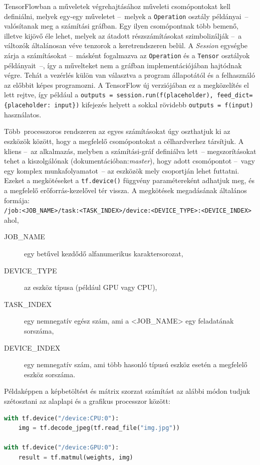 TensorFlowban a műveletek végrehajtásához műveleti csomópontokat kell definiálni, melyek egy-egy műveletet --~melyek a \verb|Operation| osztály példányai~-- valósítanak meg a számítási gráfban. Egy ilyen csomópontnak több bemenő, illetve kijövő éle lehet, melyek az átadott részszámításokat szimbolizálják --~a változók általánosan véve tenzorok a keretrendszeren belül. A \emph{Session} egységbe zárja a számításokat --~másként fogalmazva az \verb|Operation| és a \verb|Tensor| osztályok példányait~--, így a művelteket nem a gráfban implementációjában hajtódnak végre. Tehát a vezérlés külön van választva a program állapotától és a felhasználó az előbbit képes programozni. A TensorFlow új verziójában ez a megközelítés el lett rejtve, így például a \verb|outputs = session.run(f(placeholder), feed_dict={placeholder: input})| kifejezés helyett a sokkal rövidebb \verb|outputs = f(input)| használatos.

Több~processzoros rendszeren az egyes számításokat úgy oszthatjuk ki az eszközök között, hogy a megfelelő csomópontokat a célhardverhez társítjuk.
A kliens --~az alkalmazás, melyben a számítási-gráf definiálva lett~-- megszorításokat tehet a kiszolgálónak (dokumentációban:\emph{master}), hogy adott csomópontot --~vagy egy komplex munkafolyamatot~-- az eszközök mely csoportján lehet futtatni. Ezeket a megkötéseket a \verb|tf.device()| függvény paramétereként adhatjuk meg, és a megfelelő erőforrás-kezelővel tér vissza. A megkötések megadásának általános formája:\\
\verb|/job:<JOB_NAME>/task:<TASK_INDEX>/device:<DEVICE_TYPE>:<DEVICE_INDEX>|
ahol,
\begin{description}
	\item[JOB\_NAME] egy betűvel kezdődő alfanumerikus karaktersorozat,
	\item[DEVICE\_TYPE] az eszköz típusa (például GPU vagy CPU),
	\item[TASK\_INDEX] egy nemnegatív egész szám, ami a <JOB\_NAME> egy feladatának sorszáma,
	\item[DEVICE\_INDEX] egy nemnegatív szám, ami több hasonló típusú eszköz esetén a megfelelő eszköz sorszáma.
\end{description}
Példaképpen a képbetöltést és mátrix szorzat számítást az alábbi módon tudjuk szétosztani az alaplapi és a grafikus processzor között:\cite{github:TF1-guide_distribution}
\begin{lstlisting}[language=Python]
with tf.device("/device:CPU:0"):
    img = tf.decode_jpeg(tf.read_file("img.jpg"))

with tf.device("/device:GPU:0"):
    result = tf.matmul(weights, img)
\end{lstlisting}


